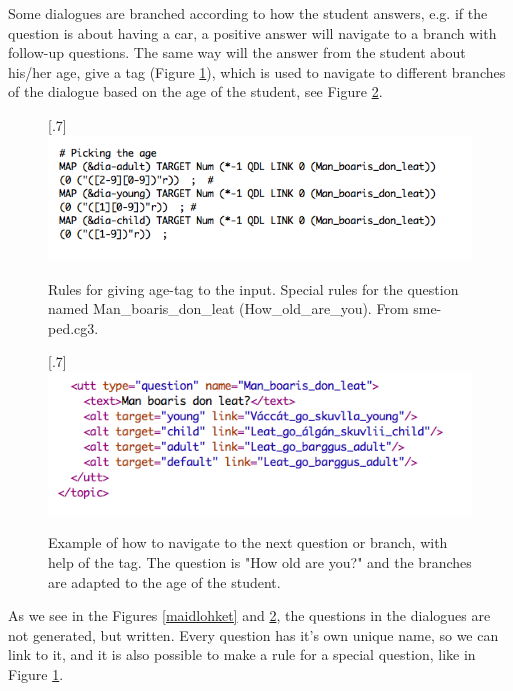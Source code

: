 \documentclass[a4paper,12pt]{article}
\begin{document}
Some dialogues are branched according to how the student answers, e.g. if the question is about having a car, a positive answer will navigate to a branch with follow-up questions. The same way will the answer from the student about his/her age, give a tag (Figure \ref{age}), which is used to navigate to different branches of the dialogue based on the age of the student, see Figure \ref{branch}.


\begin{figure}[htbp]
\begin{center}
\scalebox{.7}[.7]{\includegraphics{img/picking_age.png}}\\
\caption{Rules for giving age-tag to the input. Special rules for the question named Man\_boaris\_don\_leat (How\_old\_are\_you). From sme-ped.cg3.}
\label{age}
\end{center}
\end{figure}


\begin{figure}[htbp]
\begin{center}
\scalebox{.7}[.7]{\includegraphics{img/Man_boaris.png}}\\
\caption{Example of how to navigate to the next question or branch, with help of the tag.  The question is "How old are you?" and the branches are adapted to the age of the student.}
\label{branch}
\end{center}
\end{figure}

As we see in the Figures \ref{maidlohket} and \ref{branch}, the questions in the dialogues are not generated, but written. Every question has it's own unique name, so we can link to it, and it is also possible to make a rule for a special question, like in Figure \ref{age}.  
\end{document}
